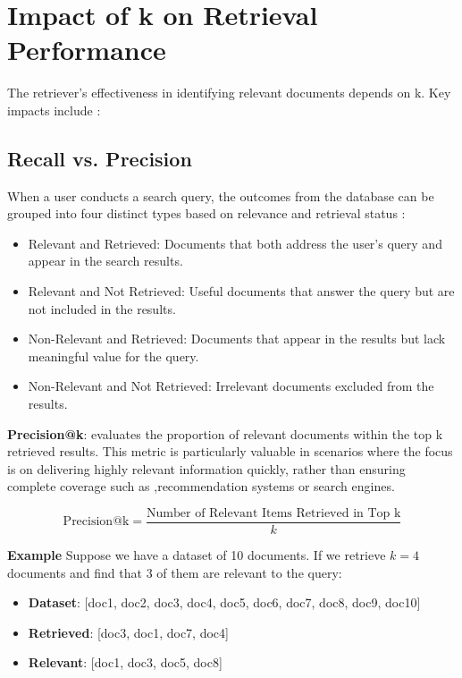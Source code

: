 \section{Impact of k on Retrieval Performance}
The retriever's effectiveness in identifying relevant documents depends on k. Key impacts include :
\subsection{Recall vs. Precision} 
When a user conducts a search query, the outcomes from the database can be grouped into four distinct types based on relevance and retrieval status \cite{geeksforgeeks2022precision}:
\begin{itemize}
	\item {Relevant and Retrieved:} Documents that both address the user’s query and appear in the search results.
	\item {Relevant and Not Retrieved:} Useful documents that answer the query but are not included in the results.
	
	\item {Non-Relevant and Retrieved:} Documents that appear in the results but lack meaningful value for the query.
	 
	\item {Non-Relevant and Not Retrieved:} Irrelevant documents excluded from the results.
\end{itemize}


\textbf{Precision@k}: evaluates the proportion of relevant documents within the top k retrieved results. This metric is particularly valuable in scenarios where the focus is on delivering highly relevant information quickly, rather than ensuring complete coverage such as ,recommendation systems or search engines\cite{deconvoluteai2024metrics}.


\[
\text{Precision@k} = \frac{\text{Number of Relevant Items Retrieved in Top k}}{k}
\]

\textbf{Example}
Suppose we have a dataset of 10 documents. If we retrieve \( k = 4 \) documents and find that 3 of them are relevant to the query:

\begin{itemize}
	\item \textbf{Dataset}: [doc1, doc2, doc3, doc4, doc5, doc6, doc7, doc8, doc9, doc10]
	\item \textbf{Retrieved}: [doc3, doc1, doc7, doc4]
	\item \textbf{Relevant}: [doc1, doc3, doc5, doc8]
\end{itemize}


